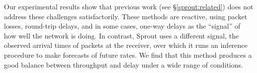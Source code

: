 Our experimental results show that previous work (see
\S\ref{sprout:related}) does not address these challenges
satisfactorily. These methods are reactive, using packet
losses, round-trip delays, and in some cases, one-way delays as the
``signal'' of how well the network is doing. In contrast, Sprout uses
a different signal, the observed arrival times of packets at the
receiver, over which it runs an inference procedure to make
forecasts of future rates. We find that this method produces a good
balance between throughput and delay under a wide range of
conditions.


